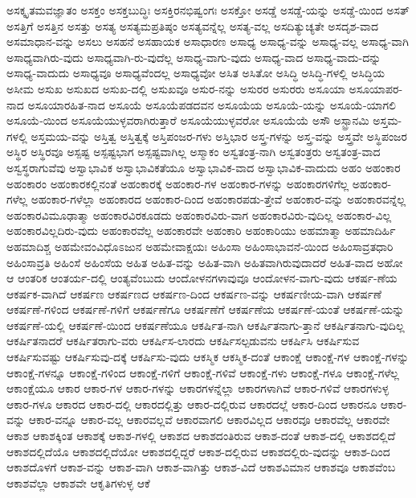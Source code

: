 {ಅಸಕ್ಕೃತಮವಜ್ಞಾತಂ
ಅಸಕ್ತಂ
ಅಸಕ್ತಬುದ್ಧಿಃ
ಅಸಕ್ತಿರನಭಿಷ್ವಂಗಃ
ಅಸಕ್ತೋ
ಅಸಡ್ಡೆ
ಅಸಡ್ಡೆ-ಯನ್ನು
ಅಸಡ್ಡೆ-ಯಿಂದ
ಅಸತ್
ಅಸತ್ತಿಗೆ
ಅಸತ್ತಿನ
ಅಸತ್ತು
ಅಸತ್ಯ
ಅಸತ್ಯಮಪ್ರತಿಷ್ಠಂ
ಅಸತ್ಯವನ್ನೆಲ್ಲ
ಅಸತ್ಯ-ವಲ್ಲ
ಅಸದಿತ್ಯುಚ್ಯತೇ
ಅಸದೃಶ-ವಾದ
ಅಸಮಾಧಾನ-ವನ್ನು
ಅಸಲು
ಅಸಹನೆ
ಅಸಹಾಯಕ
ಅಸಾಧಾರಣ
ಅಸಾಧ್ಯ
ಅಸಾಧ್ಯ-ವನ್ನು
ಅಸಾಧ್ಯ-ವಲ್ಲ
ಅಸಾಧ್ಯ-ವಾಗಿ
ಅಸಾಧ್ಯವಾಗಿರು-ವುದು
ಅಸಾಧ್ಯವಾಗಿ-ರು-ವುದೆಲ್ಲ
ಅಸಾಧ್ಯ-ವಾಗು-ವುದು
ಅಸಾಧ್ಯ-ವಾದ
ಅಸಾಧ್ಯ-ವಾದು-ದನ್ನು
ಅಸಾಧ್ಯ-ವಾದುದು
ಅಸಾಧ್ಯವೂ
ಅಸಾಧ್ಯವೆಂದಲ್ಲ
ಅಸಾಧ್ಯವೋ
ಅಸಿತ
ಅಸಿತೋ
ಅಸಿದ್ಧಿ
ಅಸಿದ್ಧಿ-ಗಳಲ್ಲಿ
ಅಸಿದ್ಧಿಯ
ಅಸೀಮ
ಅಸುಖ
ಅಸುಖದ
ಅಸುಖ-ದಲ್ಲಿ
ಅಸುಖವೂ
ಅಸುರ-ನನ್ನು
ಅಸುರರ
ಅಸುರರು
ಅಸೂಯಾ
ಅಸೂಯಾಪರ-ನಾದ
ಅಸೂಯಾರಹಿತ-ನಾದ
ಅಸೂಯೆ
ಅಸೂಯೆಪಡದವನ
ಅಸೂಯೆಯ
ಅಸೂಯೆ-ಯನ್ನು
ಅಸೂಯೆ-ಯಾಗಲಿ
ಅಸೂಯೆ-ಯಿಂದ
ಅಸೂಯೆಯುಳ್ಳವರಾಗಿರುತ್ತಾರೆ
ಅಸೂಯೆಯುಳ್ಳವರೋ
ಅಸೂಯೆಯೆ
ಅಸೌ
ಅಸ್ಟ್ರಾನಮಿ
ಅಸ್ತಮ-ಗಳಲ್ಲಿ
ಅಸ್ತಮಯ-ವನ್ನು
ಅಸ್ತಿತ್ವ
ಅಸ್ತಿತ್ವಕ್ಕೆ
ಅಸ್ತಿಪಂಜರ-ಗಳು
ಅಸ್ತಿಭಾರ
ಅಸ್ತ್ರ-ಗಳನ್ನು
ಅಸ್ತ್ರ-ವನ್ನು
ಅಸ್ತ್ರವೇ
ಅಸ್ಥಿಪಂಜರ
ಅಸ್ಥಿರ
ಅಸ್ಥಿರವೂ
ಅಸ್ಪಷ್ಟ
ಅಸ್ಪಷ್ಟಭಾಗ
ಅಸ್ಪಷ್ಟವಾಗಿಲ್ಲ
ಅಸ್ಮಾಕಂ
ಅಸ್ವತಂತ್ರ-ನಾಗಿ
ಅಸ್ವತಂತ್ರರು
ಅಸ್ವತಂತ್ರ-ವಾದ
ಅಸ್ವಸ್ಥರಾಗುವೆವು
ಅಸ್ವಾಭಾವಿಕ
ಅಸ್ವಾಭಾವಿಕತೆಯೂ
ಅಸ್ವಾಭಾವಿಕ-ವಾದ
ಅಸ್ವಾಭಾವಿಕ-ವಾದುದು
ಅಹಂ
ಅಹಂಕಾರ
ಅಹಂಕಾರಂ
ಅಹಂಕಾರಕಲ್ಲಿನಂತೆ
ಅಹಂಕಾರಕ್ಕೆ
ಅಹಂಕಾರ-ಗಳ
ಅಹಂಕಾರ-ಗಳನ್ನು
ಅಹಂಕಾರಗಳಿಗೆಲ್ಲ
ಅಹಂಕಾರ-ಗಳೆಲ್ಲ
ಅಹಂಕಾರ-ಗಳೆಲ್ಲಾ
ಅಹಂಕಾರದ
ಅಹಂಕಾರ-ದಿಂದ
ಅಹಂಕಾರಪಡು-ತ್ತೇವೆ
ಅಹಂಕಾರ-ವನ್ನು
ಅಹಂಕಾರವನ್ನೆಲ್ಲ
ಅಹಂಕಾರವಿಮೂಢಾತ್ಮಾ
ಅಹಂಕಾರವಿರಕೂಡದು
ಅಹಂಕಾರವಿರು-ವಾಗ
ಅಹಂಕಾರವಿರು-ವುದಿಲ್ಲ
ಅಹಂಕಾರ-ವಿಲ್ಲ
ಅಹಂಕಾರವಿಲ್ಲದಿರು-ವುದು
ಅಹಂಕಾರವೆಲ್ಲ
ಅಹಂಕಾರವೇ
ಅಹಂಕಾರಿ
ಅಹಂಕಾರಿಯು
ಅಹಮಾತ್ಮಾ
ಅಹಮಾದಿರ್ಹಿ
ಅಹಮಾದಿಶ್ಚ
ಅಹಮೇವಂವಿಧೊಽಜುನ
ಅಹಮೇವಾಕ್ಷಯಃ
ಅಹಿಂಸಾ
ಅಹಿಂಸಾಭಾವನೆ-ಯಿಂದ
ಅಹಿಂಸಾವ್ರತಧಾರಿ
ಅಹಿಂಸಾವ್ರತಿ
ಅಹಿಂಸೆ
ಅಹಿಂಸೆಯ
ಅಹಿತ
ಅಹಿತ-ವನ್ನು
ಅಹಿತ-ವಾಗಿ
ಅಹಿತವಾಗಿರುವುದಾದರೆ
ಅಹಿತ-ವಾದ
ಅಹೋ
ಆ
ಆಂತರಿಕ
ಆಂತರ್ಯ-ದಲ್ಲಿ
ಆಂತ್ಯವೆಂಬುದು
ಆಂದೋಳನಗಳಾವುವೂ
ಆಂದೋಳನ-ವಾಗು-ವುದು
ಆಕರ್ಷ-ಣೆಯ
ಆಕರ್ಷಕ-ವಾಗಿದೆ
ಆಕರ್ಷಣ
ಆಕರ್ಷಣದ
ಆಕರ್ಷಣ-ದಿಂದ
ಆಕರ್ಷಣ-ವನ್ನು
ಆಕರ್ಷಣೀಯ-ವಾಗಿ
ಆಕರ್ಷಣೆ
ಆಕರ್ಷಣೆ-ಗಳಿಂದ
ಆಕರ್ಷಣೆ-ಗಳಿಗೆ
ಆಕರ್ಷಣೆಗೂ
ಆಕರ್ಷಣೆಗೆ
ಆಕರ್ಷಣೆಯ
ಆಕರ್ಷಣೆ-ಯಂತೆ
ಆಕರ್ಷಣೆ-ಯನ್ನು
ಆಕರ್ಷಣೆ-ಯಲ್ಲಿ
ಆಕರ್ಷಣೆ-ಯಿಂದ
ಆಕರ್ಷಣೆಯೂ
ಆಕರ್ಷಿತ-ನಾಗಿ
ಆಕರ್ಷಿತನಾಗು-ತ್ತಾನೆ
ಆಕರ್ಷಿತನಾಗು-ವುದಿಲ್ಲ
ಆಕರ್ಷಿತನಾದರೆ
ಆಕರ್ಷಿತರಾಗು-ವರು
ಆಕರ್ಷಿಸ-ಲಾರದು
ಆಕರ್ಷಿಸಲ್ಪಡುವನು
ಆಕರ್ಷಿಸಿ
ಆಕರ್ಷಿಸುವ
ಆಕರ್ಷಿಸುವಷ್ಟು
ಆಕರ್ಷಿಸುವು-ದಕ್ಕೆ
ಆಕರ್ಷಿಸು-ವುದು
ಆಕಸ್ಮಿಕ
ಆಕಸ್ಮಿಕ-ದಂತೆ
ಆಕಾಂಕ್ಷೆ
ಆಕಾಂಕ್ಷೆ-ಗಳ
ಆಕಾಂಕ್ಷೆ-ಗಳನ್ನು
ಆಕಾಂಕ್ಷೆ-ಗಳನ್ನೂ
ಆಕಾಂಕ್ಷೆ-ಗಳಿಂದ
ಆಕಾಂಕ್ಷೆ-ಗಳಿಗೆ
ಆಕಾಂಕ್ಷೆ-ಗಳಿವೆ
ಆಕಾಂಕ್ಷೆ-ಗಳು
ಆಕಾಂಕ್ಷೆ-ಗಳೂ
ಆಕಾಂಕ್ಷೆ-ಗಳೆಲ್ಲ
ಆಕಾಂಕ್ಷೆಯೂ
ಆಕಾರ
ಆಕಾರ-ಗಳ
ಆಕಾರ-ಗಳನ್ನು
ಆಕಾರಗಳನ್ನೆಲ್ಲಾ
ಆಕಾರಗಳಾಗಿವೆ
ಆಕಾರ-ಗಳಿವೆ
ಆಕಾರಗಳುಳ್ಳ
ಆಕಾರ-ಗಳೂ
ಆಕಾರದ
ಆಕಾರ-ದಲ್ಲಿ
ಆಕಾರದಲ್ಲಿತ್ತು
ಆಕಾರ-ದಲ್ಲಿರುವ
ಆಕಾರದಲ್ಲೆ
ಆಕಾರ-ದಿಂದ
ಆಕಾರನೂ
ಆಕಾರ-ವನ್ನು
ಆಕಾರ-ವನ್ನೂ
ಆಕಾರ-ವಲ್ಲ
ಆಕಾರವಲ್ಲವೆ
ಆಕಾರವಾಗಲಿ
ಆಕಾರವಿಲ್ಲದ
ಆಕಾರವೂ
ಆಕಾರವೆಲ್ಲ
ಆಕಾರವೇ
ಆಕಾಶ
ಆಕಾಶಕ್ಕಿಂತ
ಆಕಾಶಕ್ಕೆ
ಆಕಾಶ-ಗಳಲ್ಲಿ
ಆಕಾಶದ
ಆಕಾಶದಂತಿರುವ
ಆಕಾಶ-ದಂತೆ
ಆಕಾಶ-ದಲ್ಲಿ
ಆಕಾಶದಲ್ಲಿದೆ
ಆಕಾಶದಲ್ಲಿದೆಯೊ
ಆಕಾಶದಲ್ಲಿದೆಯೋ
ಆಕಾಶದಲ್ಲಿದ್ದರೆ
ಆಕಾಶ-ದಲ್ಲಿರುವ
ಆಕಾಶದಲ್ಲಿರು-ವುದನ್ನು
ಆಕಾಶ-ದಿಂದ
ಆಕಾಶದೊಳಗೆ
ಆಕಾಶ-ವನ್ನು
ಆಕಾಶ-ವಾಗಿ
ಆಕಾಶ-ವಾಗಿತ್ತು
ಆಕಾಶ-ವಿದೆ
ಆಕಾಶವಿಮಾನ
ಆಕಾಶವೂ
ಆಕಾಶವೆಂಬ
ಆಕಾಶವೆಲ್ಲಾ
ಆಕಾಶವೇ
ಆಕೃತಿಗಳುಳ್ಳ
ಆಕೆ
}
